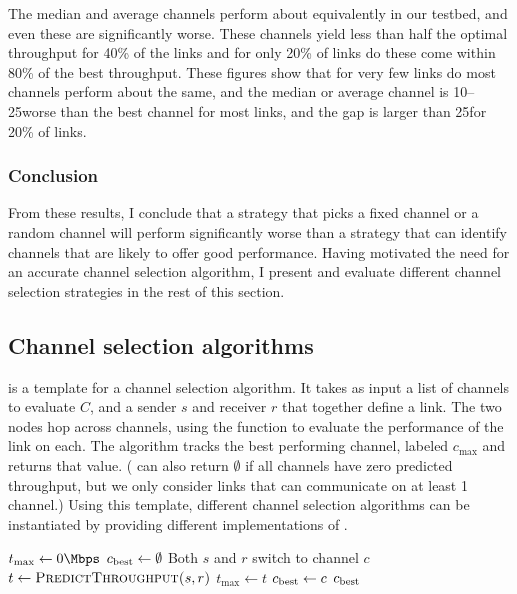 The median and average channels perform about equivalently in our testbed, and even these are significantly worse. These channels yield less than half the optimal throughput for 40\% of the links and for only 20\% of links do these come within 80\% of the best throughput. These figures show that for very few links do most channels perform about the same, and the median or average channel is 10--25\Mbps worse than the best channel for most links, and the gap is larger than 25\Mbps for 20\% of links.

\subsubsection{Conclusion}
From these results, I conclude that a strategy that picks a fixed channel or a random channel will perform significantly worse than a strategy that can identify channels that are likely to offer good performance. Having motivated the need for an accurate channel selection algorithm, I present and evaluate different channel selection strategies in the rest of this section.

\subsection{Channel selection algorithms}
 is a template for a channel selection algorithm. It takes as input a list of channels to evaluate $C$, and a sender $s$ and receiver $r$ that together define a link. The two nodes hop across channels, using the  function to evaluate the performance of the link on each. The algorithm tracks the best performing channel, labeled $c_{\max}$ and returns that value. ( can also return $\emptyset$ if all channels have zero predicted throughput, but we only consider links that can communicate on at least 1 channel.) Using this template, different channel selection algorithms can be instantiated by providing different implementations of .

\begin{algorithm}[htp]
\caption{\label{alg:chan_sel_basic}}
\begin{algorithmic}
\STATE $t_{\max}\gets 0\Mbps$
\STATE $c_{\mathrm{best}} \gets \emptyset$
\STATE Both $s$ and $r$ switch to channel $c$
\STATE $t \gets \textsc{PredictThroughput($s, r$)}$
	\STATE $t_{\max} \gets t$
	\STATE $c_{\mathrm{best}} \gets c$
\ENDIF
\RETURN $c_{\mathrm{best}}$
\ENDFOR
\end{algorithmic}
\end{algorithm}

